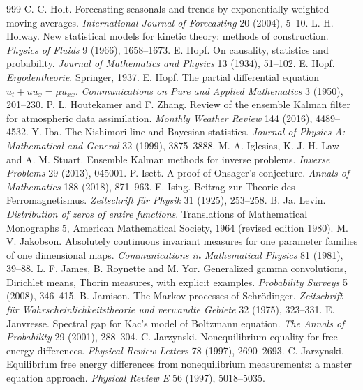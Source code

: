 \begin{thebibliography}{999}
 C. C. Holt. Forecasting seasonals and trends by exponentially weighted moving averages. \emph{International Journal of Forecasting} 20 (2004), 5--10.
 L. H. Holway. New statistical models for kinetic theory: methods of construction. \emph{Physics of Fluids} 9 (1966), 1658--1673.
 E. Hopf. On causality, statistics and probability. \emph{Journal of Mathematics and Physics} 13 (1934), 51--102.
 E. Hopf. \emph{Ergodentheorie}. Springer, 1937.
 E. Hopf. The partial differential equation $u_t+uu_x = \mu u_{xx}$. \emph{Communications on Pure and Applied Mathematics} 3 (1950), 201--230.
 P. L. Houtekamer and F. Zhang. Review of the ensemble Kalman filter for atmospheric data assimilation. \emph{Monthly Weather Review} 144 (2016), 4489--4532.
 Y. Iba. The Nishimori line and Bayesian statistics. \emph{Journal of Physics A: Mathematical and General} 32 (1999), 3875--3888.
 M. A. Iglesias, K. J. H. Law and A. M. Stuart. Ensemble Kalman methods for inverse problems. \emph{Inverse Problems} 29 (2013), 045001.
 P. Isett. A proof of Onsager's conjecture. \emph{Annals of Mathematics} 188 (2018), 871--963.
 E. Ising. Beitrag zur Theorie des Ferromagnetismus. \emph{Zeitschrift f\"ur Physik} 31 (1925), 253--258.
 B. Ja. Levin. \emph{Distribution of zeros of entire functions}. Translations of Mathematical Monographs 5, American Mathematical Society, 1964 (revised edition 1980).
 M. V. Jakobson. Absolutely continuous invariant measures for one parameter families of one dimensional maps. \emph{Communications in Mathematical Physics} 81 (1981), 39--88.
 L. F. James, B. Roynette and M. Yor. Generalized gamma convolutions, Dirichlet means, Thorin measures, with explicit examples. \emph{Probability Surveys} 5 (2008), 346--415.
 B. Jamison. The Markov processes of Schr\"odinger. \emph{Zeitschrift f\"ur Wahrscheinlichkeitstheorie und verwandte Gebiete} 32 (1975), 323--331.
 E. Janvresse. Spectral gap for Kac's model of Boltzmann equation. \emph{The Annals of Probability} 29 (2001), 288--304.
 C. Jarzynski. Nonequilibrium equality for free energy differences. \emph{Physical Review Letters} 78 (1997), 2690--2693.
 C. Jarzynski. Equilibrium free energy differences from nonequilibrium measurements: a master equation approach. \emph{Physical Review E} 56 (1997), 5018--5035.

\end{thebibliography}
